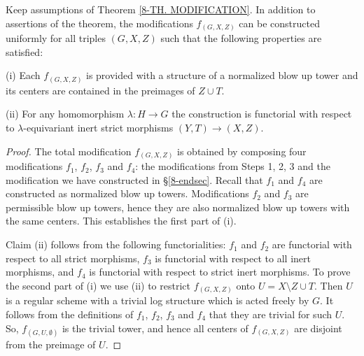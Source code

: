 \documentclass[10pt]{../fichiers-configuration-latex/smfart}
\begin{document}
\begin{theorem2}\label{8-addendum} Keep assumptions of Theorem
\ref{8-TH. MODIFICATION}. In addition to assertions of the theorem,
the modifications $f_{(G,X,Z)}$ can be constructed uniformly for all
triples $(G,X,Z)$ such that the following properties are satisfied:

(i) Each $f_{(G,X,Z)}$ is provided with a structure of a normalized
blow up tower and its centers are contained in the preimages of
$Z\cup T$.

(ii) For any homomorphism $\lambda:H\to G$ the construction is
functorial with respect to $\lambda$-equivariant inert strict
morphisms $(Y,T)\to(X,Z)$.
\end{theorem2}
\begin{proof} The total modification $f_{(G,X,Z)}$ is obtained
by composing four modifications $f_1$, $f_2$, $f_3$ and $f_4$:
the modifications from Steps 1, 2, 3 and the modification we have
constructed in \S\ref{8-endsec}. Recall that $f_1$ and $f_4$ are constructed
as normalized blow up towers. Modifications $f_2$ and $f_3$ are
permissible blow up towers, hence they are also normalized blow up
towers with the same centers. This establishes the first part of (i).

Claim (ii) follows from the following functorialities: $f_1$
and $f_2$ are functorial with respect to all strict morphisms,
$f_3$ is functorial with respect to all inert morphisms, and $f_4$
is functorial with respect to strict inert morphisms. To prove
the second part of (i) we use (ii) to restrict $f_{(G,X,Z)}$ onto
$U=X\setminus{Z\cup T}$. Then $U$ is a regular scheme with a trivial
log structure which is acted freely by $G$. It follows from the
definitions of $f_1$, $f_2$, $f_3$ and $f_4$ that they are trivial
for such $U$. So, $f_{(G,U,\emptyset)}$ is the trivial tower, and
hence all centers of $f_{(G,X,Z)}$ are disjoint from the preimage
of $U$.
\end{proof}

\ifx\danslelivre\undefined


\end{document}
